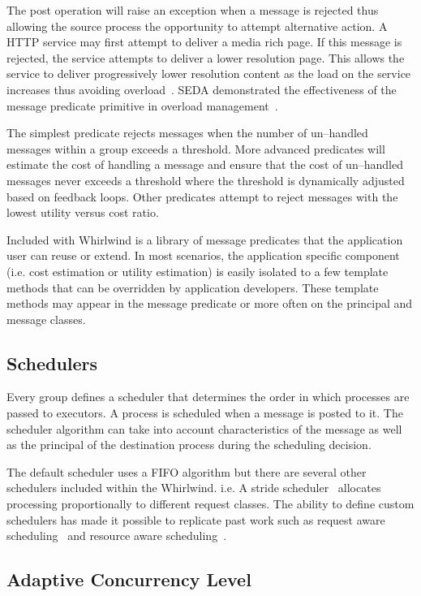 \documentclass[conference]{IEEEtran}
\begin{document}
The post operation will raise an exception when a message is rejected thus allowing the source process the opportunity to attempt alternative action. A HTTP service may first attempt to deliver a media rich page. If this message is rejected, the service attempts to deliver a lower resolution page. This allows the service to deliver progressively lower resolution content as the load on the service increases thus avoiding overload~\cite{abdelzaher99web}. SEDA demonstrated the effectiveness of the message predicate primitive in overload management~\cite{welsh03Adaptive}. 

The simplest predicate rejects messages when the number of un--handled messages within a group exceeds a threshold. More advanced predicates will estimate the cost of handling a message and ensure that the cost of un--handled messages never exceeds a threshold where the threshold is dynamically adjusted based on feedback loops. Other predicates attempt to reject messages with the lowest utility versus cost ratio.

Included with Whirlwind is a library of message predicates that the application user can reuse or extend. In most scenarios, the application specific component (i.e. cost estimation or utility estimation) is easily isolated to a few template methods that can be overridden by application developers. These template methods may appear in the message predicate or more often on the principal and message classes.

\subsection{Schedulers}

Every group defines a scheduler that determines the order in which processes are passed to executors. A process is scheduled when a message is posted to it. The scheduler algorithm can take into account characteristics of the message as well as the principal of the destination process during the scheduling decision.

The default scheduler uses a FIFO algorithm but there are several other schedulers included within the Whirlwind. i.e. A stride scheduler~\cite{Stride:Waldspurger:95} allocates processing proportionally to different request classes. The ability to define custom schedulers has made it possible to replicate past work such as request aware scheduling~\cite{Zhou06RequestAware} and resource aware scheduling~\cite{Behren03Capriccio}.

\subsection{Adaptive Concurrency Level}
\end{document}

